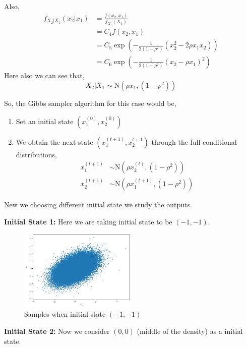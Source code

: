 \begin{example}
    Also, 
    \begin{align*}
        f_{X_2|X_1} (x_2|x_1) &= \frac{f(x_2,x_1)}{f_{X_1}(X_1)} \\ 
                    &=C_4 f(x_2,x_1) \\
                    &=C_5 \exp \left( - \frac{1}{2 (1-\rho^2)} (x_2^2 - 2 \rho x_1x_2) \right) \\
                    &= C_6 \exp \left(- \frac{1}{2 (1-\rho^2)} (x_2 - \rho x_1)^2   \right)
    \end{align*}
    Here also we can see that,
    \[
        X_2|X_1 \sim \text{N}\left(\rho x_1, (1-\rho^2)\right)
    \]

    So, the Gibbs sampler algorithm for this case would be,
    \begin{enumerate}
        \item Set an initial state $ \left(x_1^{(0)} , x_2^{(0)} \right) $
        \item We obtain the next state $ \left( x_1^{(t+1)} , x_2^{t+1} \right) $ through the full conditional distributions, 
            \begin{align*}
                x_1^{(t+1)} &\sim \text{N}\left(\rho x_2^{(t)}, (1-\rho^2) \right) \\
                x_2 ^{(t+1)} &\sim \text{N}\left(\rho x_1^{(t+1)}, (1-\rho^2) \right) 
            \end{align*}
    \end{enumerate}
    New we choosing different initial state we study the outputs.

    \textbf{Initial State 1:} Here we are taking initial state to be $(-1,-1)$. 
    \begin{figure}[H]
        \centering
        \includegraphics[width=0.5\textwidth]{images/gibbs/example1/init1.png}
        \caption{Samples when initial state $(-1,-1)$}
    \end{figure}

    \textbf{Initial State 2:} Now we consider $(0,0)$ (middle of the density) as a initial state. 


\end{example}
